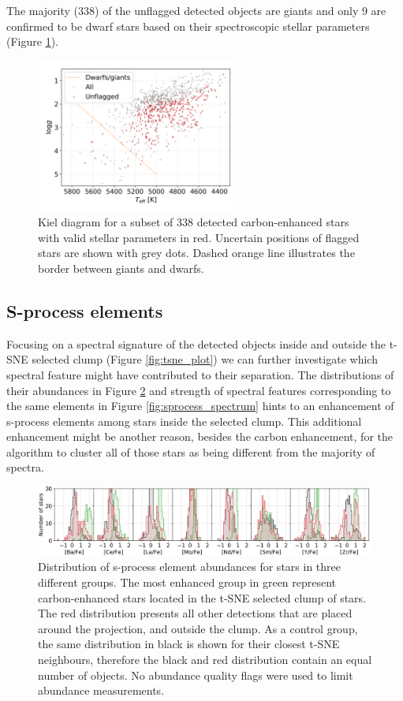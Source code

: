 The majority (338) of the unflagged detected objects are giants and only 9 are confirmed to be dwarf stars based on their spectroscopic stellar parameters (Figure \ref{fig:kiel_plot}).

\begin{figure}
	\centering
	\includegraphics[width=0.6\textwidth]{Kiel_diagram.png}
	\caption{Kiel diagram for a subset of 338 detected carbon-enhanced stars with valid stellar parameters in red. Uncertain positions of flagged stars are shown with grey dots. Dashed orange line illustrates the border between giants and dwarfs.}
	\label{fig:kiel_plot}
\end{figure}

\subsection{S-process elements}
\label{sec:sprocess}
Focusing on a spectral signature of the detected objects inside and outside the t-SNE selected clump (Figure \ref{fig:tsne_plot}) we can further investigate which spectral feature might have contributed to their separation. The distributions of their abundances in Figure \ref{fig:sprocess_hist} and strength of spectral features corresponding to the same elements in Figure \ref{fig:sprocess_spectrum} hints to an enhancement of s-process elements among stars inside the selected clump. This additional enhancement might be another reason, besides the carbon enhancement, for the algorithm to cluster all of those stars as being different from the majority of spectra.

\begin{figure}
	\centering
	\includegraphics[width=\textwidth]{sprocess_hist.png}
	\caption{Distribution of s-process element abundances for stars in three different groups. The most enhanced group in green represent carbon-enhanced stars located in the t-SNE selected clump of stars. The red distribution presents all other detections that are placed around the projection, and outside the clump. As a control group, the same distribution in black is shown for their closest t-SNE neighbours, therefore the black and red distribution contain an equal number of objects. No abundance quality flags were used to limit abundance measurements.}
	\label{fig:sprocess_hist}
\end{figure}

